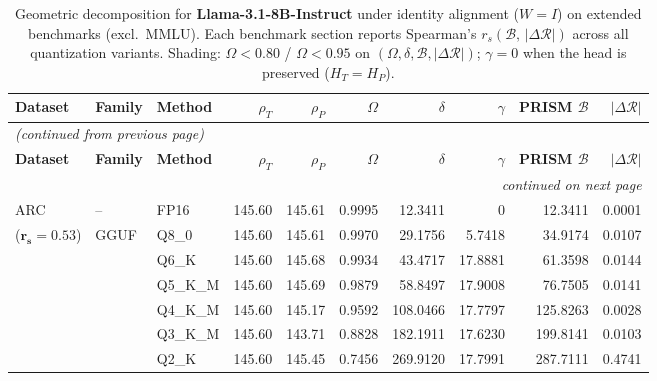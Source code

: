 \begingroup
\small
\setlength{\tabcolsep}{4pt}
\renewcommand{\arraystretch}{1.05}
\setlength{\LTcapwidth}{\textwidth}
\begin{longtable}{ll l rrrrrrr}
\caption{Geometric decomposition for \textbf{Llama-3.1-8B-Instruct} under identity alignment ($W{=}I$) on extended benchmarks (excl.\ MMLU). Each benchmark section reports Spearman's $r_s(\mathcal{B},\,|\Delta\mathcal{R}|)$ across all quantization variants. Shading: \colorbox{red!35}{$\Omega{<}0.80$} / \colorbox{red!18}{$\Omega{<}0.95$} on $(\Omega,\delta,\mathcal{B},|\Delta\mathcal{R}|)$; \colorbox{cyan!12}{$\gamma{=}0$} when the head is preserved ($H_T{=}H_P$).}\label{tab:llama_instruct_decomposition_ext_bound}\\
\toprule
\textbf{Dataset} & \textbf{Family} & \textbf{Method} & \textbf{$\rho_T$} & \textbf{$\rho_P$} & \textbf{$\Omega$} & \textbf{$\delta$} & \textbf{$\gamma$} & \textbf{PRISM $\mathcal{B}$} & \textbf{$|\Delta\mathcal{R}|$} \\
\midrule
\endfirsthead
\multicolumn{10}{l}{\small\itshape (continued from previous page)}\\
\toprule
\textbf{Dataset} & \textbf{Family} & \textbf{Method} & \textbf{$\rho_T$} & \textbf{$\rho_P$} & \textbf{$\Omega$} & \textbf{$\delta$} & \textbf{$\gamma$} & \textbf{PRISM $\mathcal{B}$} & \textbf{$|\Delta\mathcal{R}|$} \\
\midrule
\endhead
\midrule
\multicolumn{10}{r}{\small\itshape continued on next page}\\
\endfoot
\bottomrule
\endlastfoot
ARC & -- & FP16 & 145.60 & 145.61 & 0.9995 & 12.3411 & \cellcolor{cyan!12} $0$ & 12.3411 & 0.0001 \\
{\small ($\mathbf{r_s{=}0.53}$)} & GGUF & Q8\_0 & 145.60 & 145.61 & 0.9970 & 29.1756 & 5.7418 & 34.9174 & 0.0107 \\
 &  & Q6\_K & 145.60 & 145.68 & 0.9934 & 43.4717 & 17.8881 & 61.3598 & 0.0144 \\
 &  & Q5\_K\_M & 145.60 & 145.69 & 0.9879 & 58.8497 & 17.9008 & 76.7505 & 0.0141 \\
 &  & Q4\_K\_M & 145.60 & 145.17 & 0.9592 & 108.0466 & 17.7797 & 125.8263 & 0.0028 \\
 &  & Q3\_K\_M & 145.60 & 143.71 & \cellcolor{red!18} 0.8828 & \cellcolor{red!18} 182.1911 & 17.6230 & \cellcolor{red!18} 199.8141 & \cellcolor{red!18} 0.0103 \\
 &  & Q2\_K & 145.60 & 145.45 & \cellcolor{red!35} 0.7456 & \cellcolor{red!35} 269.9120 & 17.7991 & \cellcolor{red!35} 287.7111 & \cellcolor{red!35} 0.4741 \\

\end{longtable}
